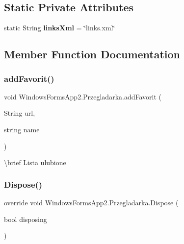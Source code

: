 \subsection*{Static Private Attributes}
\begin{DoxyCompactItemize}
\item 
\mbox{\label{class_windows_forms_app2_1_1_przegladarka_abef2d22eb265cae84b4100b314e8947f}} 
static String {\bfseries links\+Xml} = \char`\"{}links.\+xml\char`\"{}
\end{DoxyCompactItemize}


\subsection{Member Function Documentation}
\mbox{\label{class_windows_forms_app2_1_1_przegladarka_ae81e3a8848fdaaecd2f51a2f17e60540}} 
\subsubsection{\texorpdfstring{add\+Favorit()}{addFavorit()}}
{\footnotesize\ttfamily void Windows\+Forms\+App2.\+Przegladarka.\+add\+Favorit (\begin{DoxyParamCaption}\item[{String}]{url,  }\item[{string}]{name }\end{DoxyParamCaption})\hspace{0.3cm}{\ttfamily [private]}}

\textbackslash{}brief Lista ulubione \mbox{\label{class_windows_forms_app2_1_1_przegladarka_a1952e96668e9dae2dd62a80771162925}} 
\subsubsection{\texorpdfstring{Dispose()}{Dispose()}}
{\footnotesize\ttfamily override void Windows\+Forms\+App2.\+Przegladarka.\+Dispose (\begin{DoxyParamCaption}\item[{bool}]{disposing }\end{DoxyParamCaption})\hspace{0.3cm}{\ttfamily [protected]}}



